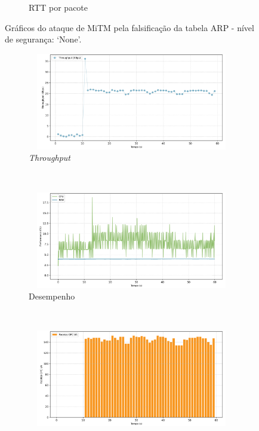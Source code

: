 \begin{apendicesenv}
\begin{figure}[htbp!]
\begin{subfigure}[t]{0.5\textwidth}
        \caption{RTT por pacote}
    \end{subfigure}%
    \label{fig:0-mitm_arp}
    \caption{Gráficos do ataque de MiTM pela falsificação da tabela ARP - nível de segurança: `None'.}
\end{figure}

\begin{figure}[htbp!]
    \centering
    \begin{subfigure}[t]{0.5\textwidth}
        \centering
        \includegraphics[width=1\textwidth, height=120pt]{USPSC-img/output/cropped/1-mitm_arp-tput.png}
        \caption{\textit{Throughput}}
    \end{subfigure}%
    ~ 
    \begin{subfigure}[t]{0.5\textwidth}
        \centering
        \includegraphics[width=1\textwidth, height=120pt]{USPSC-img/output/cropped/1-mitm_arp-perf.png}
        \caption{Desempenho}
    \end{subfigure}%
    \\
    \begin{subfigure}[t]{0.5\textwidth}
        \centering
        \includegraphics[width=1\textwidth, height=120pt]{USPSC-img/output/cropped/1-mitm_arp-pack.png}

\end{subfigure}
\end{figure}
\end{apendicesenv}
